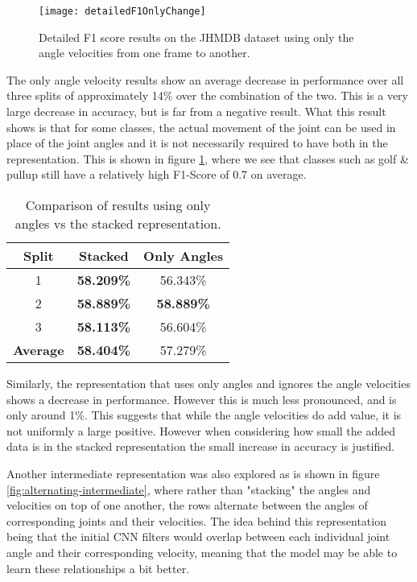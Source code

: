 \begin{figure}[ht]
	\texttt{[image: detailedF1OnlyChange]}
	\centering
	\caption{Detailed F1 score results on the JHMDB dataset using only the angle velocities from one frame to another.}
	\label{fig:detailed-f1-only-change}
\end{figure}

The only angle velocity results show an average decrease in performance over all three splits of approximately 14\% over the combination of the two. This is a very large decrease in accuracy, but is far from a negative result. What this result shows is that for some classes, the actual movement of the joint can be used in place of the joint angles and it is not necessarily required to have both in the representation. This is shown in figure \ref{fig:detailed-f1-only-change}, where we see that classes such as golf \& pullup still have a relatively high F1-Score of 0.7 on average.

\begin{table}[ht]
	\centering
	\begin{tabular}{||c c c||} 
		\hline
		\textbf{Split} & \textbf{Stacked} & \textbf{Only Angles} \\ [0.5ex] 
		\hline\hline
		1 & \textbf{58.209\%} & 56.343\% \\ 
		\hline
		2 & \textbf{58.889\%} & \textbf{58.889\%} \\
		\hline
		3 & \textbf{58.113\%} & 56.604\% \\
		\hline
		\hline
		\textbf{Average} & \textbf{58.404\%} & 57.279\% \\
		\hline
	\end{tabular}
	\caption{Comparison of results using only angles vs the stacked representation.}
	\label{tab:acc-results-v-angle}
\end{table}

Similarly, the representation that uses only angles and ignores the angle velocities shows a decrease in performance. However this is much less pronounced, and is only around 1\%. This suggests that while the angle velocities do add value, it is not uniformly a large positive. However when considering how small the added data is in the stacked representation the small increase in accuracy is justified.

Another intermediate representation was also explored as is shown in figure \ref{fig:alternating-intermediate}, where rather than "stacking" the angles and velocities on top of one another, the rows alternate between the angles of corresponding joints and their velocities. The idea behind this representation being that the initial CNN filters would overlap between each individual joint angle and their corresponding velocity, meaning that the model may be able to learn these relationships a bit better.

